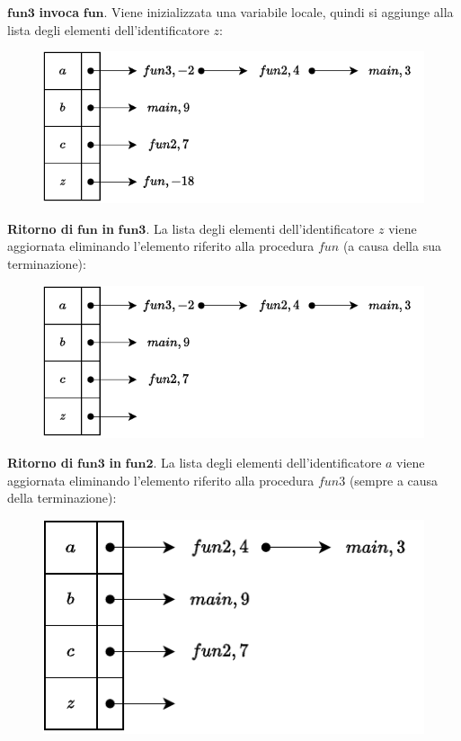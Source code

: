 \documentclass[a4paper]{article}
\begin{document}
	\noindent
	$\mathbf{fun3}$\textbf{ invoca }$\mathbf{fun}$. Viene inizializzata una variabile locale, quindi si aggiunge alla lista degli elementi dell'identificatore $z$:
	\begin{figure}[!htp]
		\centering
		\includegraphics[width=.9\textwidth]{img/ex3-021.pdf}
	\end{figure}
	
	\noindent
	\textbf{Ritorno di }$\mathbf{fun}$\textbf{ in }$\mathbf{fun3}$. La lista degli elementi dell'identificatore $z$ viene aggiornata eliminando l'elemento riferito alla procedura $fun$ (a causa della sua terminazione):
	\begin{figure}[!htp]
		\centering
		\includegraphics[width=\textwidth]{img/ex3-022.pdf}
	\end{figure}
	
	\noindent
	\textbf{Ritorno di }$\mathbf{fun3}$\textbf{ in }$\mathbf{fun2}$. La lista degli elementi dell'identificatore $a$ viene aggiornata eliminando l'elemento riferito alla procedura $fun3$ (sempre a causa della terminazione):
	\begin{figure}[!htp]
		\centering
		\includegraphics[width=.7\textwidth]{img/ex3-023.pdf}
	\end{figure}\newpage
	
\end{document}
